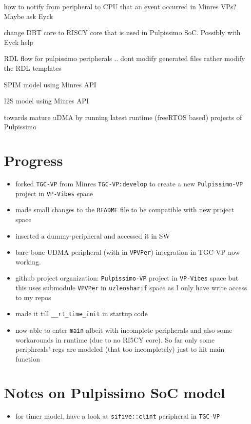 \documentclass{article}
\begin{document}
\begin{todolist}
 \item how to notify from peripheral to CPU that an event occurred in Minres VPs? Maybe ask Eyck
 \item change DBT core to RISCY core that is used in Pulpissimo SoC. Possibly with Eyck help
 \item RDL flow for pulpissimo peripherals .. dont modify generated files rather modify the RDL templates
 \item SPIM model using Minres API
 \item I2S model using Minres API
 \item towards mature uDMA by running latest runtime (freeRTOS based) projects of Pulpissimo
\end{todolist}

\section{Progress}
\begin{itemize}
 \item forked \texttt{TGC-VP} from Minres \texttt{TGC-VP:develop} to create a new \texttt{Pulpissimo-VP} project in
       \texttt{VP-Vibes} space
 \item made small changes to the \texttt{README} file to be compatible with new project space
 \item inserted a dummy-peripheral and accessed it in SW
 \item bare-bone UDMA peripheral (with in \texttt{VPVPer}) integration in TGC-VP now working.
 \item github project organization: \texttt{Pulpissimo-VP} project in \texttt{VP-Vibes} space but this uses
       submodule \texttt{VPVPer} in \texttt{uzleosharif} space as I only have write access to my repos
 \item made it till \texttt{\_\_rt\_time\_init} in startup code
 \item now able to enter \texttt{main} albeit with incomplete peripherals and also some workarounds in runtime (due to no RI5CY core). So far
       only some periphreals' regs are modeled (that too incompletely) just to hit main function
\end{itemize}

\section{Notes on Pulpissimo SoC model}
\begin{itemize}
 \item for timer model, have a look at \texttt{sifive::clint} peripheral in \texttt{TGC-VP}
\end{itemize}
\end{document}
